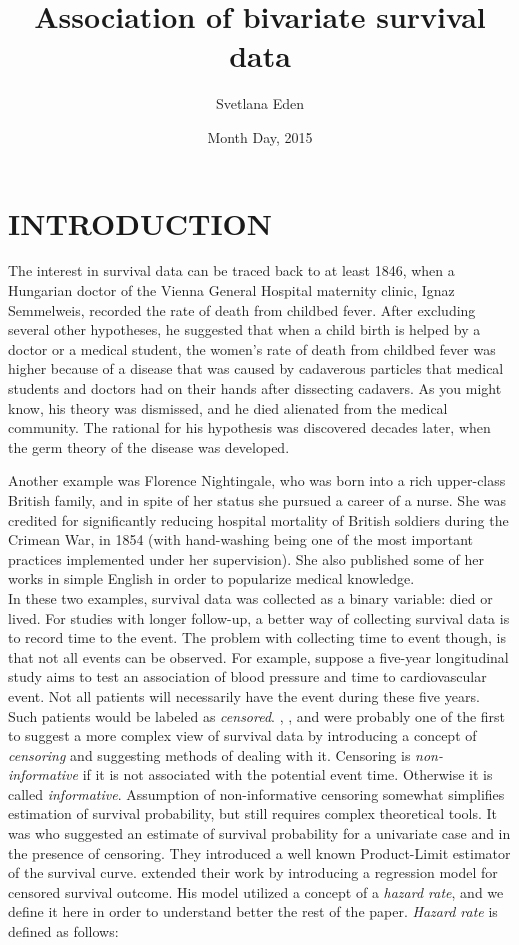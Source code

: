 \documentclass[]{article}
\title{Association of bivariate survival data}
\author{Svetlana Eden}
\date{Month Day, 2015}
\begin{document}
\maketitle
\tableofcontents
\listoffigures
\listoftables
\clearpage

\section{INTRODUCTION}
The interest in survival data can be traced back to at least 1846, when a Hungarian doctor of the Vienna General Hospital maternity clinic, Ignaz Semmelweis, recorded the rate of death from childbed fever. After excluding several other hypotheses, he suggested that when a child birth is helped by a doctor or a medical student, the women's rate of death from childbed fever was higher because of a disease that was caused by cadaverous particles that medical students and doctors had on their hands after dissecting cadavers. As you might know, his theory was dismissed, and he died alienated from the medical community. The rational for his hypothesis was discovered decades later, when the germ theory of the disease was developed. 


Another example was Florence Nightingale, who was born into a rich upper-class British family, and in spite of her status she pursued a career of a nurse. She was credited for significantly reducing hospital mortality of British soldiers during the Crimean War, in 1854 (with hand-washing being one of the most important practices implemented under her supervision). She also published some of her works in simple English in order to popularize medical knowledge.\\

In these two examples, survival data was collected as a binary variable: died or lived. For studies with longer follow-up, a better way of collecting survival data is to record time to the event. The problem with collecting time to event though, is that not all events can be observed. For example, suppose a five-year longitudinal study aims to test an association of blood pressure and time to cardiovascular event. Not all patients will necessarily have the event during these five years. Such patients would be labeled as \emph{censored}.  \cite{fisher1931truncated},  \cite{hald1949maximum}, and \cite{swan1969computing} were probably one of the first to suggest a more complex view of survival data by introducing a concept of \emph{censoring} and suggesting methods of dealing with it. Censoring is \emph{non-informative} if it is not associated with the potential event time. Otherwise it is called \emph{informative}. Assumption of non-informative censoring somewhat simplifies estimation of survival probability, but still requires complex theoretical tools. It was \cite{kaplan1958nonparametric} who suggested an estimate of survival probability for a univariate case and in the presence of censoring. They introduced a well known Product-Limit estimator of the survival curve. \cite{david1972regression} extended their work by introducing a regression model for censored survival outcome. His model utilized a concept of a \emph{hazard rate}, and we define it here in order to understand better the rest of the paper. \emph{Hazard rate} is defined as follows:
\end{document}
